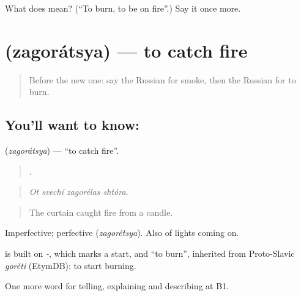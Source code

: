 \begin{tcolorbox}[breakable,colback=teal!4,colframe=teal!35!black,title={Before you move on}]
What does  mean? (\textquotedblleft{}To burn, to be on fire\textquotedblright{}.) Say it once more.
\end{tcolorbox}
\section[\texorpdfstring{\ru{загораться} (zagorátsya)}{загораться (zagorátsya)}]{ (zagorátsya) — to catch fire}

\label{lesson:RU-C295-zagoratsya}



\begin{quote}
Before the new one: say the Russian for smoke, then the Russian for to burn.
\end{quote}

\subsection*{You'll want to know: }
\textbf{} (\emph{zagorátsya}) — \textquotedblleft{}to catch fire\textquotedblright{}.

\begin{quote}
   .
\end{quote}

\begin{quote}
\emph{Ot svechí zagorélas shtóra.}
\end{quote}

\begin{quote}
The curtain caught fire from a candle.
\end{quote}

Imperfective; perfective \emph{} (\emph{zagorétsya}). Also of lights coming on.

\begin{cousinweb}
\emph{} is built on \emph{-}, which marks a start, and \emph{} \textquotedblleft{}to burn\textquotedblright{}, inherited from Proto-Slavic \emph{gorěti} (EtymDB): to start burning.
\end{cousinweb}

\begin{grammarlens}[title={What you've built}]
One more word for telling, explaining and describing at B1.
\end{grammarlens}

